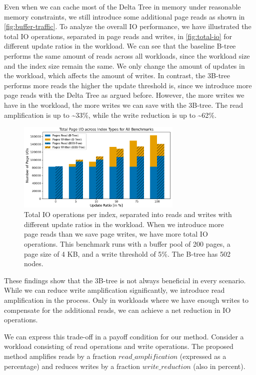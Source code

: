 Even when we can cache most of the Delta Tree in memory under reasonable memory constraints, we still introduce some additional page reads as shown in \autoref{fig:buffer-traffic}.
To analyze the overall \ac{IO} performance, we have illustrated the total \ac{IO} operations, separated in page reads and writes, in \autoref{fig:total-io} for different update ratios in the workload.
We can see that the baseline B-tree performs the same amount of reads across all workloads, since the workload size and the index size remain the same.
We only change the amount of updates in the workload, which affects the amount of writes.
In contrast, the 3B-tree performs more reads the higher the update threshold is, since we introduce more page reads with the Delta Tree as argued before.
However, the more writes we have in the workload, the more writes we can save with the 3B-tree.
The read amplification is up to \textasciitilde33\%, while the write reduction is up to \textasciitilde62\%.

\begin{figure}[htbp]
  \centering
  \includegraphics[width=0.7\textwidth]{figures/evaluation/pageviews_total_io_across_update_ratios.png}
    \caption{Total \ac{IO} operations per index, separated into reads and writes with different update ratios in the workload. When we introduce more page reads than we save page writes, we have more total \ac{IO} operations. This benchmark runs with a buffer pool of 200 pages, a page size of 4 KB, and a write threshold of 5\%. The B-tree has 502 nodes.}
  \label{fig:total-io}
\end{figure}

These findings show that the 3B-tree is not always beneficial in every scenario.
While we can reduce write amplification significantly, we introduce read amplification in the process.
Only in workloads where we have enough writes to compensate for the additional reads, we can achieve a net reduction in \ac{IO} operations.

We can express this trade-off in a payoff condition for our method.
Consider a workload consisting of read operations and write operations.
The proposed method amplifies reads by a fraction $read\_amplification$ (expressed as a percentage)  
and reduces writes by a fraction $write\_reduction$ (also in percent).

